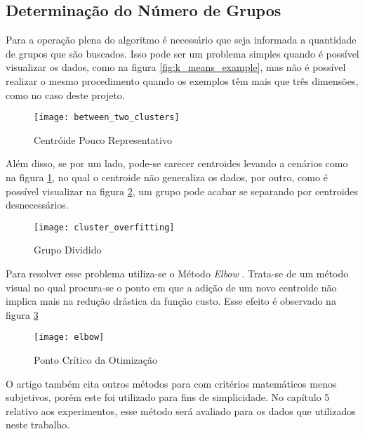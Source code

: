 \subsection{Determinação do Número de Grupos}

Para a operação plena do algoritmo é necessário que seja informada a quantidade de grupos que são buscados. Isso pode ser um problema simples quando é possível visualizar os dados, como na figura \ref{fig:k_means_example}, mas não é possível realizar o mesmo procedimento quando os exemplos têm mais que três dimensões, como no caso deste projeto.

\begin{figure}
\texttt{[image: between\_two\_clusters]}
\caption[Centróide Pouco Representativo]{Centróide Pouco Representativo} \label{fig:between_two_clusters}
\end{figure}

Além disso, se por um lado, pode-se carecer centroides levando a cenários como na figura \ref{fig:between_two_clusters}, no qual o centroide não generaliza os dados, por outro, como é possível visualizar na figura \ref{fig:cluster_overfitting}, um grupo pode acabar se separando por centroides desnecessários.

\begin{figure}[htbp]
\centering
\texttt{[image: cluster\_overfitting]}
\caption[Grupo Dividido]{Grupo Dividido} \label{fig:cluster_overfitting}
\end{figure}

Para resolver esse problema utiliza-se o Método \textit{Elbow} \citep{kodinariya2013review}. Trata-se de um método visual no qual procura-se o ponto em que a adição de um novo centroide não implica mais na redução drástica da função custo. Esse efeito é observado na figura \ref{fig:elbow}

\begin{figure}[htbp]
\centering
\texttt{[image: elbow]}
\caption[Ponto Crítico da Otimização]{Ponto Crítico da Otimização} \label{fig:elbow}
\end{figure}

O artigo \citep{kodinariya2013review} também cita outros métodos para com critérios matemáticos menos subjetivos, porém este foi utilizado para fins de simplicidade. No capítulo 5 relativo aos experimentos, esse método será avaliado para os dados que utilizados neste trabalho.